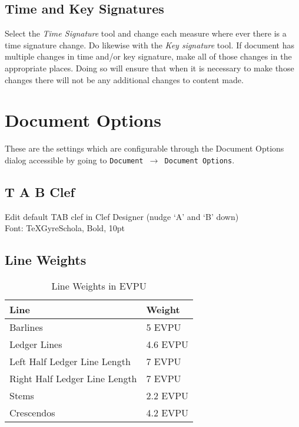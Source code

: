 \documentclass[]{memoir}
\begin{document}
\section{Time and Key Signatures}
\label{sec:time-key-signatures}

Select the \textit{Time Signature} tool and change each measure where ever there is a time signature change. Do likewise with the \textit{Key signature} tool. If document has multiple changes in time and/or key signature, make all of those changes in the appropriate places. Doing so will ensure that when it is necessary to make those changes there will not be any additional changes to content made. 


\chapter{Document Options}
These are the settings which are configurable through the
Document Options dialog accessible by going to \texttt{Document $\rightarrow$ Document Options}.
\section{T A B Clef}
Edit default TAB clef in Clef Designer (nudge `A' and 	`B' down)\\
Font: TeXGyreSchola, Bold, 10pt
\section{Line Weights}
\begin{table}
  \begin{center}
\begin{tabular}[h!]{l l}
  Line & Weight\\\hline
  Barlines & 5 EVPU\\
  Ledger Lines & 4.6 EVPU\\
  Left Half Ledger Line Length & 7 EVPU\\
  Right Half Ledger Line Length & 7 EVPU\\
  Stems & 2.2 EVPU\\
  Crescendos & 4.2 EVPU\\
\end{tabular}
\end{center}
\caption{Line Weights in EVPU}
\end{table}
\end{document}

